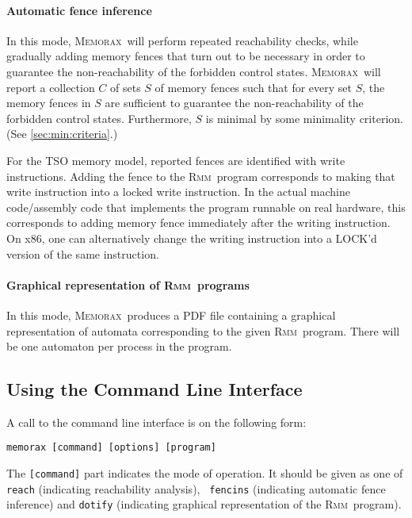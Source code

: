 \documentclass[a4paper]{article}
\newcommand{\memorax}{\textsc{Memorax}}
\newcommand{\rmm}{\textsc{Rmm}}
\newcommand{\binary}{memorax} %
\begin{document}
\paragraph{Automatic fence inference}
In this mode, \memorax\ will perform repeated reachability checks,
while gradually adding memory fences that turn out to be necessary in
order to guarantee the non-reachability of the forbidden control
states. \memorax\ will report a collection $C$ of sets $S$ of memory
fences such that for every set $S$, the memory fences in $S$ are
sufficient to guarantee the non-reachability of the forbidden control
states. Furthermore, $S$ is minimal by some minimality criterion. (See
\cref{sec:min:criteria}.)

For the TSO memory model, reported fences are identified with write
instructions. Adding the fence to the \rmm\ program corresponds to
making that write instruction into a locked write instruction. In the
actual machine code/assembly code that implements the program runnable
on real hardware, this corresponds to adding memory fence immediately
after the writing instruction. On x86, one can alternatively change
the writing instruction into a LOCK'd version of the same instruction.

\paragraph{Graphical representation of \rmm\ programs}
In this mode, \memorax\ produces a PDF file containing a graphical
representation of automata corresponding to the given \rmm\
program. There will be one automaton per process in the program.

\subsection{Using the Command Line Interface}

A call to the command line interface is on the following form:

\vspace{15pt}

\noindent
{\tt \binary{} [command] [options] [program]}

\vspace{15pt}

The {\tt [command]} part indicates the mode of operation. It should be
given as one of {\tt reach} (indicating reachability analysis), {\tt
  fencins} (indicating automatic fence inference) and {\tt dotify}
(indicating graphical representation of the \rmm\ program).
\end{document}
